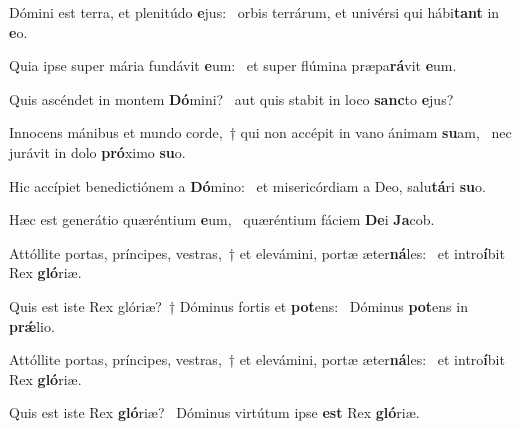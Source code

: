 \item Dómini est terra, et plenitúdo \textbf{e}jus:~\psstar{} orbis terrárum, et univérsi qui hábi\textbf{tant} in \textbf{e}o.
\item Quia ipse super mária fundávit \textbf{e}um:~\psstar{} et super flúmina præpa\textbf{rá}vit \textbf{e}um.
\item Quis ascéndet in montem \textbf{Dó}mini?~\psstar{} aut quis stabit in loco \textbf{sanc}to \textbf{e}jus?
\item Innocens mánibus et mundo corde,~† qui non accépit in vano ánimam \textbf{su}am,~\psstar{} nec jurávit in dolo \textbf{pró}ximo \textbf{su}o.
\item Hic accípiet benedictiónem a \textbf{Dó}mino:~\psstar{} et misericórdiam a Deo, salu\textbf{tá}ri \textbf{su}o.
\item Hæc est generátio quæréntium \textbf{e}um,~\psstar{} quæréntium fáciem \textbf{De}i \textbf{Ja}cob.
\item Attóllite portas, príncipes, vestras,~† et elevámini, portæ æter\textbf{ná}les:~\psstar{} et intro\textbf{í}bit Rex \textbf{gló}riæ.
\item Quis est iste Rex glóriæ?~† Dóminus fortis et \textbf{pot}ens:~\psstar{} Dóminus \textbf{pot}ens in \textbf{prǽ}lio.
\item Attóllite portas, príncipes, vestras,~† et elevámini, portæ æter\textbf{ná}les:~\psstar{} et intro\textbf{í}bit Rex \textbf{gló}riæ.
\item Quis est iste Rex \textbf{gló}riæ?~\psstar{} Dóminus virtútum ipse \textbf{est} Rex \textbf{gló}riæ.
